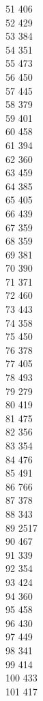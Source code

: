 { 51	406 \\
 52	429 \\
 53	384 \\
 54	351 \\
 55	473 \\
 56	450 \\
 57	445 \\
 58	379 \\
 59	401 \\
 60	458 \\
 61	394 \\
 62	360 \\
 63	459 \\
 64	385 \\
 65	405 \\
 66	439 \\
 67	359 \\
 68	359 \\
 69	381 \\
 70	390 \\
 71	371 \\
 72	460 \\
 73	443 \\
 74	358 \\
 75	450 \\
 76	378 \\
 77	405 \\
 78	493 \\
 79	279 \\
 80	419 \\
 81	475 \\
 82	356 \\
 83	354 \\
 84	476 \\
 85	491 \\
 86	766 \\
 87	378 \\
 88	343 \\
 89	2517 \\
 90	467 \\
 91	339 \\
 92	354 \\
 93	424 \\
 94	360 \\
 95	458 \\
 96	430 \\
 97	449 \\
 98	341 \\
 99	414 \\
 100	433 \\
 101	417 \\
}
